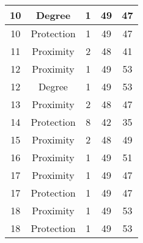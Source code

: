 \documentclass[results.tex]{subfiles}
\begin{document}
\begin{center}
\begin{tabular}{| c || c | c | c | c |}
            \hline
            10                      & Degree                       & 1                      & 49                      & 47                   \\
            \hline
            10                      & Protection                   & 1                      & 49                      & 47                   \\
            \hline
            11                      & Proximity                    & 2                      & 48                      & 41                   \\
            \hline
            12                      & Proximity                    & 1                      & 49                      & 53                   \\
            \hline
            12                      & Degree                       & 1                      & 49                      & 53                   \\
            \hline
            13                      & Proximity                    & 2                      & 48                      & 47                   \\
            \hline
            14                      & Protection                   & 8                      & 42                      & 35                   \\
            \hline
            15                      & Proximity                    & 2                      & 48                      & 49                   \\
            \hline
            16                      & Proximity                    & 1                      & 49                      & 51                   \\
            \hline
            17                      & Proximity                    & 1                      & 49                      & 47                   \\
            \hline
            17                      & Protection                   & 1                      & 49                      & 47                   \\
            \hline
            18                      & Proximity                    & 1                      & 49                      & 53                   \\
            \hline
            18                      & Protection                   & 1                      & 49                      & 53                   \\

\end{tabular}
\end{center}
\end{document}
